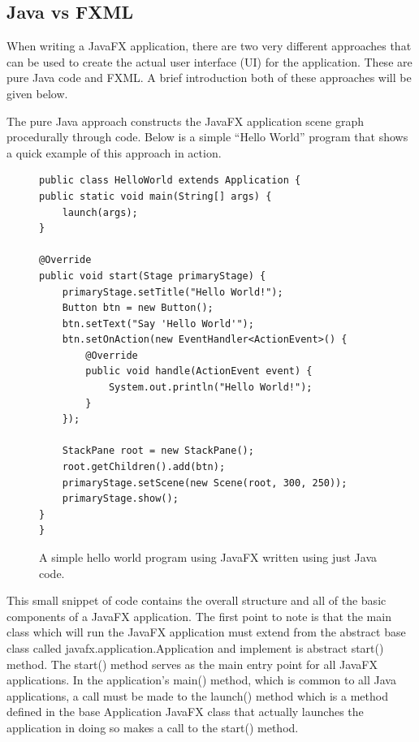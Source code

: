\subsection{Java vs FXML}
When writing a JavaFX application, there are two very different approaches that can be used to create the actual user interface (UI) for the application. These are pure Java code and FXML. A brief introduction both of these approaches will be given below. 

The pure Java approach constructs the JavaFX application scene graph procedurally through code. Below is a simple “Hello World” program that shows a quick example of this approach in action.
\begin{figure}[th]
\centering
\begin{lstlisting}
public class HelloWorld extends Application {
public static void main(String[] args) {
	launch(args);
}

@Override
public void start(Stage primaryStage) {
	primaryStage.setTitle("Hello World!");
	Button btn = new Button();
	btn.setText("Say 'Hello World'");
	btn.setOnAction(new EventHandler<ActionEvent>() {
		@Override
		public void handle(ActionEvent event) {
			System.out.println("Hello World!");
		}
	});
	
	StackPane root = new StackPane();
	root.getChildren().add(btn);
	primaryStage.setScene(new Scene(root, 300, 250));
	primaryStage.show();
}
}
\end{lstlisting}
\caption[JavaFX HelloWorld]{A simple hello world program using JavaFX written using just Java code.}
\label{fig:helloWorldJavaFX1}
\end{figure}
This small snippet of code contains the overall structure and all of the basic components of a JavaFX application. The first point to note is that the main class which will run the JavaFX application must extend from the abstract base class called javafx.application.Application and implement is abstract start() method. The start() method serves as the main entry point for all JavaFX applications. In the application’s main() method, which is common to all Java applications, a call must be made to the launch() method which is a method defined in the base Application JavaFX class that actually launches the application in doing so makes a call to the start() method. 

